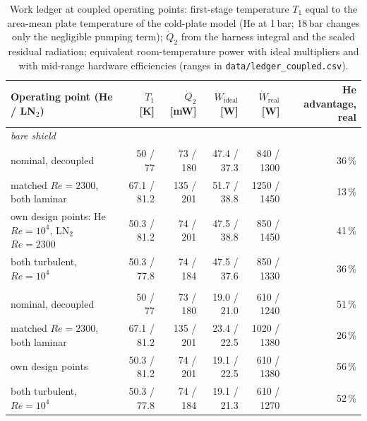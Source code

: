 \documentclass[preprint,12pt]{elsarticle}
\newcommand{\LNtwo}{LN$_2$}
\renewcommand{\Re}{\mathit{Re}}
\begin{document}
\begin{table}[tbp]
\centering\footnotesize\setlength{\tabcolsep}{3.5pt}
\caption{Work ledger at coupled operating points: first-stage temperature $T_1$ equal to the
area-mean plate temperature of the cold-plate model (He at 1\,bar; 18\,bar changes only the
negligible pumping term); $\dot Q_2$ from the harness integral and the scaled residual
radiation; equivalent room-temperature power with ideal multipliers and with mid-range
hardware efficiencies (ranges in \texttt{data/ledger\_coupled.csv}).}
\label{tab:coupled}
\begin{tabular}{l r r r r r}
\toprule
Operating point (He / \LNtwo) & $T_1$ [K] & $\dot Q_2$ [mW] & $\dot W_{\mathrm{ideal}}$ [W] & $\dot W_{\mathrm{real}}$ [W] & He advantage, real \\
\midrule
\multicolumn{6}{l}{\textit{bare shield}} \\
nominal, decoupled & 50 / 77 & 73 / 180 & 47.4 / 37.3 & 840 / 1300 & 36\,\% \\
matched $\Re=2300$, both laminar & 67.1 / 81.2 & 135 / 201 & 51.7 / 38.8 & 1250 / 1450 & 13\,\% \\
own design points: He $\Re=10^4$, \LNtwo\ $\Re=2300$ & 50.3 / 81.2 & 74 / 201 & 47.5 / 38.8 & 850 / 1450 & 41\,\% \\
both turbulent, $\Re=10^4$ & 50.3 / 77.8 & 74 / 184 & 47.5 / 37.6 & 850 / 1330 & 36\,\% \\
\addlinespace[2pt]
\multicolumn{6}{l}{\textit{MLI-equivalent shield}} \\
nominal, decoupled & 50 / 77 & 73 / 180 & 19.0 / 21.0 & 610 / 1240 & 51\,\% \\
matched $\Re=2300$, both laminar & 67.1 / 81.2 & 135 / 201 & 23.4 / 22.5 & 1020 / 1380 & 26\,\% \\
own design points & 50.3 / 81.2 & 74 / 201 & 19.1 / 22.5 & 610 / 1380 & 56\,\% \\
both turbulent, $\Re=10^4$ & 50.3 / 77.8 & 74 / 184 & 19.1 / 21.3 & 610 / 1270 & 52\,\% \\
\bottomrule
\end{tabular}
\end{table}
\end{document}
